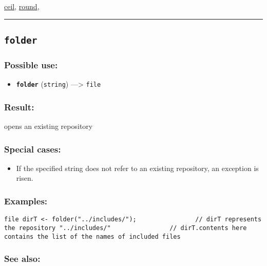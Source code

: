 \documentclass[]{book}
\providecommand{\tightlist}{%
  \setlength{\itemsep}{0pt}\setlength{\parskip}{0pt}}
\theoremstyle{definition}
\theoremstyle{definition}
\theoremstyle{definition}
\theoremstyle{remark}
\begin{document}
\href{operators-b-to-c.html\#ceil}{ceil},
\href{operators-n-to-r.html\#round}{round},

\begin{center}\rule{0.5\linewidth}{\linethickness}\end{center}

\subsection{\texorpdfstring{\texttt{folder}}{folder}}\label{folder}

\subsubsection{Possible use:}\label{possible-use-172}

\begin{itemize}
\tightlist
\item
  \textbf{\texttt{folder}} (\texttt{string}) ---\textgreater{}
  \texttt{file}
\end{itemize}

\subsubsection{Result:}\label{result-166}

opens an existing repository

\subsubsection{Special cases:}\label{special-cases-64}

\begin{itemize}
\tightlist
\item
  If the specified string does not refer to an existing repository, an
  exception is risen.
\end{itemize}

\subsubsection{Examples:}\label{examples-127}

\begin{verbatim}
file dirT <- folder("../includes/");                // dirT represents the repository "../includes/"                // dirT.contents here contains the list of the names of included files 
\end{verbatim}

\subsubsection{See also:}\label{see-also-98}
\end{document}
